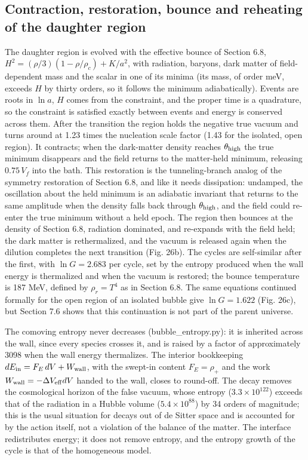 \documentclass[11pt,a4paper]{article}
\begin{document}
\subsection{Contraction, restoration, bounce and reheating of the daughter region}
The daughter region is evolved with the effective bounce of Section 6.8, $H^2=(\rho/3)(1-\rho/\rho_c)+K/a^2$, with radiation, baryons, dark matter of field-dependent mass and the scalar in one of its minima (its mass, of order meV, exceeds $H$ by thirty orders, so it follows the minimum adiabatically). Events are roots in $\ln a$, $H$ comes from the constraint, and the proper time is a quadrature, so the constraint is satisfied exactly between events and energy is conserved across them. After the transition the region holds the negative true vacuum and turns around at 1.23 times the nucleation scale factor (1.43 for the isolated, open region). It contracts; when the dark-matter density reaches $\theta_{\rm high}$ the true minimum disappears and the field returns to the matter-held minimum, releasing $0.75\,V_f$ into the bath. This restoration is the tunneling-branch analog of the symmetry restoration of Section 6.8, and like it needs dissipation: undamped, the oscillation about the held minimum is an adiabatic invariant that returns to the same amplitude when the density falls back through $\theta_{\rm high}$, and the field could re-enter the true minimum without a held epoch. The region then bounces at the density of Section 6.8, radiation dominated, and re-expands with the field held; the dark matter is rethermalized, and the vacuum is released again when the dilution completes the next transition (Fig. 26b). The cycles are self-similar after the first, with $\ln G=2.683$ per cycle, set by the entropy produced when the wall energy is thermalized and when the vacuum is restored; the bounce temperature is 187 MeV, defined by $\rho_r=T^4$ as in Section 6.8. The same equations continued formally for the open region of an isolated bubble give $\ln G=1.622$ (Fig. 26c), but Section 7.6 shows that this continuation is not part of the parent universe.

The comoving entropy never decreases (bubble\_entropy.py): it is inherited across the wall, since every species crosses it, and is raised by a factor of approximately 3098 when the wall energy thermalizes. The interior bookkeeping $dE_{\rm in}=F_E\,dV+W_{\rm wall}$, with the swept-in content $F_E=\rho_+$ and the work $W_{\rm wall}=-\Delta V_{\rm eff}dV$ handed to the wall, closes to round-off. The decay removes the cosmological horizon of the false vacuum, whose entropy ($3.3\times10^{122}$) exceeds that of the radiation in a Hubble volume ($5.4\times10^{88}$) by 34 orders of magnitude; this is the usual situation for decays out of de Sitter space and is accounted for by the action itself, not a violation of the balance of the matter. The interface redistributes energy; it does not remove entropy, and the entropy growth of the cycle is that of the homogeneous model.
\end{document}
